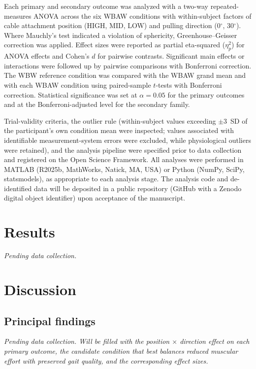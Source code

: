 \documentclass[11pt,a4paper]{article}
\begin{document}
Each primary and secondary outcome was analyzed with a two-way repeated-measures ANOVA across the six WBAW conditions with within-subject factors of cable attachment position (HIGH, MID, LOW) and pulling direction (0$^\circ$, 30$^\circ$). Where Mauchly's test indicated a violation of sphericity, Greenhouse--Geisser correction was applied. Effect sizes were reported as partial eta-squared ($\eta_p^2$) for ANOVA effects and Cohen's $d$ for pairwise contrasts. Significant main effects or interactions were followed up by pairwise comparisons with Bonferroni correction. The WBW reference condition was compared with the WBAW grand mean and with each WBAW condition using paired-sample $t$-tests with Bonferroni correction. Statistical significance was set at $\alpha = 0.05$ for the primary outcomes and at the Bonferroni-adjusted level for the secondary family.

Trial-validity criteria, the outlier rule (within-subject values exceeding $\pm 3$~SD of the participant's own condition mean were inspected; values associated with identifiable measurement-system errors were excluded, while physiological outliers were retained), and the analysis pipeline were specified prior to data collection and registered on the Open Science Framework. All analyses were performed in MATLAB (R2025b, MathWorks, Natick, MA, USA) or Python (NumPy, SciPy, statsmodels), as appropriate to each analysis stage. The analysis code and de-identified data will be deposited in a public repository (GitHub with a Zenodo digital object identifier) upon acceptance of the manuscript.

\section{Results}
\textit{Pending data collection.}

\section{Discussion}

\subsection*{Principal findings}
\textit{Pending data collection. Will be filled with the position $\times$ direction effect on each primary outcome, the candidate condition that best balances reduced muscular effort with preserved gait quality, and the corresponding effect sizes.}
\end{document}
